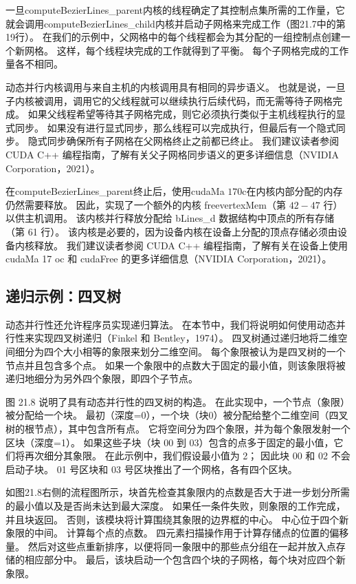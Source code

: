 一旦computeBezierLines\_parent内核的线程确定了其控制点集所需的工作量，它就会调用computeBezierLines\_child内核并启动子网格来完成工作（图21.7中的第19行）。 在我们的示例中，父网格中的每个线程都会为其分配的一组控制点创建一个新网格。 这样，每个线程块完成的工作就得到了平衡。 每个子网格完成的工作量各不相同。

动态并行内核调用与来自主机的内核调用具有相同的异步语义。 也就是说，一旦子内核被调用，调用它的父线程就可以继续执行后续代码，而无需等待子网格完成。 如果父线程希望等待其子网格完成，则它必须执行类似于主机线程执行的显式同步。 如果没有进行显式同步，那么线程可以完成执行，但最后有一个隐式同步。 隐式同步确保所有子网格在父网格终止之前都已终止。 我们建议读者参阅 CUDA C++ 编程指南，了解有关父子网格同步语义的更多详细信息（NVIDIA Corporation，2021）。

在computeBezierLines\_parent终止后，使用cudaMa $170 \mathrm{c}$在内核内部分配的内存仍然需要释放。 因此，实现了一个额外的内核 freevertexMem（第 $42-47$ 行）以供主机调用。 该内核并行释放分配给 bLines\_d 数据结构中顶点的所有存储（第 61 行）。 该内核是必要的，因为设备内核在设备上分配的顶点存储必须由设备内核释放。 我们建议读者参阅 CUDA C++ 编程指南，了解有关在设备上使用 cudaMa 17 oc 和 cudaFree 的更多详细信息（NVIDIA Corporation，2021）。

\subsection{递归示例：四叉树}
动态并行性还允许程序员实现递归算法。 在本节中，我们将说明如何使用动态并行性来实现四叉树递归（Finkel 和 Bentley，1974）。 四叉树通过递归地将二维空间细分为四个大小相等的象限来划分二维空间。 每个象限被认为是四叉树的一个节点并且包含多个点。 如果一个象限中的点数大于固定的最小值，则该象限将被递归地细分为另外四个象限，即四个子节点。

图 21.8 说明了具有动态并行性的四叉树的构造。 在此实现中，一个节点（象限）被分配给一个块。 最初（深度=0），一个块（块0）被分配给整个二维空间（四叉树的根节点），其中包含所有点。 它将空间分为四个象限，并为每个象限发射一个区块（深度=1）。 如果这些子块（块 00 到 03）包含的点多于固定的最小值，它们将再次细分其象限。 在此示例中，我们假设最小值为 2； 因此块 00 和 02 不会启动子块。 01 号区块和 03 号区块推出了一个网格，各有四个区块。

如图21.8右侧的流程图所示，块首先检查其象限内的点数是否大于进一步划分所需的最小值以及是否尚未达到最大深度。 如果任一条件失败，则象限的工作完成，并且块返回。 否则，该模块将计算围绕其象限的边界框的中心。 中心位于四个新象限的中间。 计算每个点的点数。 四元素扫描操作用于计算存储点的位置的偏移量。 然后对这些点重新排序，以便将同一象限中的那些点分组在一起并放入点存储的相应部分中。 最后，该块启动一个包含四个块的子网格，每个块对应四个新象限。

